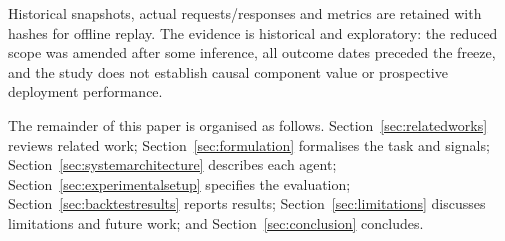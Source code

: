 Historical snapshots, actual requests/responses and metrics are retained with hashes for offline replay. The evidence is historical and exploratory: the reduced scope was amended after some inference, all outcome dates preceded the freeze, and the study does not establish causal component value or prospective deployment performance.

The remainder of this paper is organised as follows. Section~\ref{sec:relatedworks} reviews related work; Section~\ref{sec:formulation} formalises the task and signals; Section~\ref{sec:systemarchitecture} describes each agent; Section~\ref{sec:experimentalsetup} specifies the evaluation; Section~\ref{sec:backtestresults} reports results; Section~\ref{sec:limitations} discusses limitations and future work; and Section~\ref{sec:conclusion} concludes.
